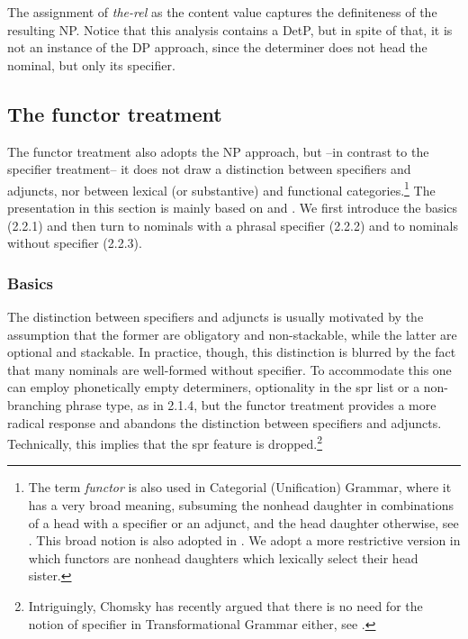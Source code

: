 \documentclass[output=paper]{langsci/langscibook}
\begin{document}
\noindent
The assignment of {\it the-rel\/} as the {\sc content} value captures 
the definiteness of the resulting NP. Notice that this analysis contains a DetP, 
but in spite of that, it is not an instance of the DP approach, since the 
determiner does not head the nominal, but only its specifier. 


\subsection{The functor treatment} 


The functor treatment also adopts the NP approach, but --in contrast to the 
specifier treatment-- it does not draw a distinction between specifiers and adjuncts, 
nor between lexical (or substantive) and functional categories.\footnote{The term {\it functor} 
is also used in Categorial (Unification) Grammar, where it has 
a very broad meaning, subsuming the nonhead daughter in combinations of a 
head with a specifier or an adjunct, and the head daughter otherwise, 
see \citet{Bouma88}. This broad notion is also adopted in 
\citet{Reape94}. We adopt a more restrictive version in which functors 
are nonhead daughters which lexically select their head sister.}  
The presentation in this section is mainly based on \citet{VanEynde06} 
and \citet{Allegranza06}. We first introduce the basics (2.2.1) and then 
turn to nominals with a phrasal specifier (2.2.2) and to nominals without specifier (2.2.3).    


\subsubsection{Basics} 


The distinction between specifiers and adjuncts is usually motivated by 
the assumption that the former are obligatory and non-stackable, while the latter  
are optional and stackable. In practice, though, this distinction 
is blurred by the fact that many nominals are well-formed without specifier.
To accommodate this one can employ phonetically empty determiners, optionality in 
the {\sc spr} list or a non-branching phrase type, as in 2.1.4,   
but the functor treatment provides a more radical response and abandons 
the distinction between specifiers and adjuncts. 
Technically, this implies that the {\sc spr} feature is dropped.\footnote{Intriguingly,
Chomsky has recently argued that there is no need for the notion of specifier in 
Transformational Grammar either, see \citet[43]{Chomsky13}.}  
\end{document}
